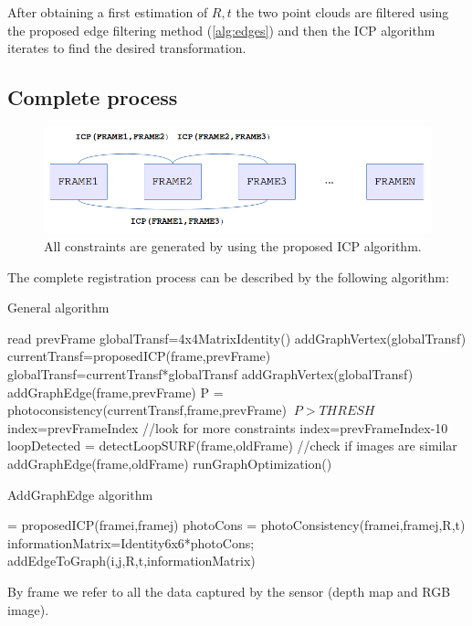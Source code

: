After obtaining a first estimation of $R,t$ the two point clouds are filtered using the proposed edge 
filtering method (\ref{alg:edges}) and then the ICP algorithm iterates to find the desired transformation.


\subsection{Complete process}

\begin{figure}[!h]
\begin{center}
\includegraphics[scale=0.55]{images/graph_icp}
\caption{All constraints are generated by using the proposed ICP algorithm.}
\end{center}
\end{figure}


The complete registration process can be described by the following algorithm:

\begin{algorithm}[H]
\caption{General algorithm}
\begin{algorithmic}[1]
\State read prevFrame
\State globalTransf=4x4MatrixIdentity()
\State addGraphVertex(globalTransf)
\State currentTransf=proposedICP(frame,prevFrame)
\State globalTransf=currentTransf*globalTransf
\State addGraphVertex(globalTransf)
\State addGraphEdge(frame,prevFrame)
\State P = photoconsistency(currentTransf,frame,prevFrame)
\If $\ P > THRESH$
\State index=prevFrameIndex //look for more constraints
\Else
\State index=prevFrameIndex-10
\EndIf
{} 
\State loopDetected = detectLoopSURF(frame,oldFrame) //check if images are similar
\State addGraphEdge(frame,oldFrame)
\EndIf
\EndFor
\EndWhile
\State runGraphOptimization()
\end{algorithmic}
\end{algorithm}

\begin{algorithm}[H]
\caption{AddGraphEdge algorithm}
\begin{algorithmic}[1]
\State [R,t] = proposedICP(framei,framej)
\State photoCons = photoConsistency(framei,framej,R,t)
\State informationMatrix=Identity6x6*photoCons;
\State addEdgeToGraph(i,j,R,t,informationMatrix)
\end{algorithmic}
\end{algorithm}
By frame we refer to all the data captured by the sensor (depth map and RGB image).

